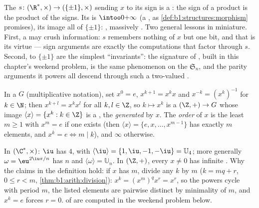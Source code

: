 \begin{example}\label{ex:b1:structures:signmorphism}
The  $s \colon (\R^*, \times) \to (\{\pm1\}, \times)$ sending
$x$ to its sign is a : the sign of a product is the
product of the signs. Its  is $\intoo0{+\infty}$ (a
, as \cref{def:b1:structures:morphism} promises), its
image all of $\{\pm1\}$: , massively .
Two general lessons in miniature. First, a  may crush
information: $s$ remembers nothing of $x$ but one bit, and that
is its virtue --- sign arguments are exactly the computations
that factor through $s$. Second,  to $\{\pm1\}$ are the
simplest ``invariants'': the signature of , built in
this chapter's weekend problem, is the same phenomenon on the
 $\mathfrak S_n$, and the parity arguments it powers all
descend through such a two-valued .
\end{example}

\begin{definition}\label{def:b1:structures:order}
In a  $G$ (multiplicative notation), set $x^0 = e$, $x^{k+1} =
x^k x$ and $x^{-k} = (x^k)^{-1}$ for $k \in \N$; then $x^{k+l} = x^k
x^l$ for all $k, l \in \Z$, so $k \mapsto x^k$ is a  $(\Z,
+) \to G$ whose image $\langle x \rangle = \{x^k : k \in \Z\}$ is a
, the  \emph{generated} by $x$. The
\emph{order} of $x$ is the least $m \geq
1$ with $x^m = e$ if one exists (then $\langle x\rangle = \{e, x,
\dots, x^{m-1}\}$ has exactly $m$ elements, and $x^k = e \iff m
\mid k$), and $\infty$ otherwise.
\end{definition}

\begin{example}\label{ex:b1:structures:order}
In $(\C^*, \times)$: $\iu$ has  $4$, with $\langle \iu \rangle
= \{1, \iu, -1, -\iu\} = \mathbb{U}_4$; more generally $\omega =
\eu^{2\iu\pi/n}$ has  $n$ and $\langle\omega\rangle =
\mathbb{U}_n$. In $(\Z, +)$, every $x \neq 0$ has infinite .
Why the claims in the definition hold: if $x$ has  $m$, divide
any $k$ by $m$ ($k = mq + r$, $0 \leq r < m$,
\cref{thm:b1:arith:division}): $x^k = (x^m)^q x^r = x^r$, so the
powers cycle with period $m$, the listed elements are pairwise
distinct by minimality of $m$, and $x^k = e$ forces $r = 0$. 
of  are computed in the weekend problem below.
\end{example}


